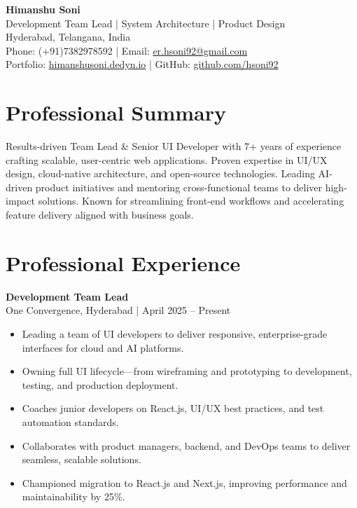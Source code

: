 \documentclass[11pt, a4paper]{article}
\newcommand{\smallgray}[1]{\textcolor{darkgray!90}{\small #1}}
\begin{document}
\begin{center}
    {\LARGE\bfseries Himanshu Soni} \\
    \vspace{2pt}
    {\normalsize Development Team Lead | System Architecture | Product Design} \\
    \vspace{2pt}
    Hyderabad, Telangana, India \\
    Phone: (+91)7382978592 | Email: \href{mailto:er.hsoni92@gmail.com}{er.hsoni92@gmail.com} \\
    Portfolio: \href{http://himanshusoni.dedyn.io}{himanshusoni.dedyn.io} | GitHub: \href{https://github.com/hsoni92}{github.com/hsoni92}
\end{center}

\hrulefill
\vspace{5pt}

\section{Professional Summary}
Results-driven Team Lead \& Senior UI Developer with 7+ years of experience crafting scalable, user-centric web applications. Proven expertise in UI/UX design, cloud-native architecture, and open-source technologies. Leading AI-driven product initiatives and mentoring cross-functional teams to deliver high-impact solutions. Known for streamlining front-end workflows and accelerating feature delivery aligned with business goals.


\section{Professional Experience}
\textbf{Development Team Lead} \\
\smallgray{One Convergence, Hyderabad | April 2025 -- Present}
\begin{itemize}
    \item Leading a team of UI developers to deliver responsive, enterprise-grade interfaces for cloud and AI platforms.
    \item Owning full UI lifecycle—from wireframing and prototyping to development, testing, and production deployment.
    \item Coaches junior developers on React.js, UI/UX best practices, and test automation standards.
    \item Collaborates with product managers, backend, and DevOps teams to deliver seamless, scalable solutions.
    \item Championed migration to React.js and Next.js, improving performance and maintainability by 25\%.
\end{itemize}
\end{document}
